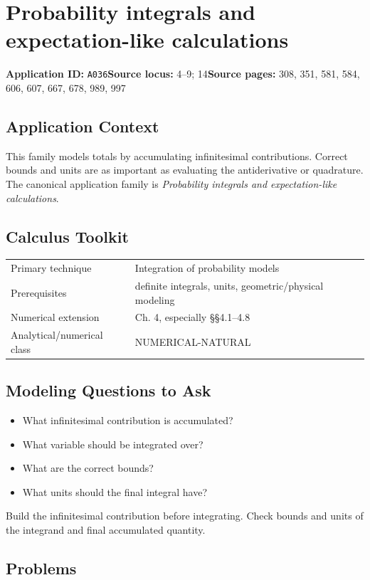 \documentclass[11pt]{book}
\newcommand{\pid}[1]{\texttt{#1}}
\begin{document}
\chapter{Probability integrals and expectation-like calculations}\label{app:A036}
\textbf{Application ID:} \pid{A036}\quad \textbf{Source locus:} 4–9; 14\quad \textbf{Source pages:} 308, 351, 581, 584, 606, 607, 667, 678, 989, 997
\section*{Application Context}
This family models totals by accumulating infinitesimal contributions. Correct bounds and units are as important as evaluating the antiderivative or quadrature. The canonical application family is \emph{Probability integrals and expectation-like calculations}.
\section*{Calculus Toolkit}
\begin{tabularx}{\textwidth}{@{}lX@{}}\toprule
Primary technique & Integration of probability models \\
Prerequisites & definite integrals, units, geometric/physical modeling \\
Numerical extension & Ch. 4, especially §§4.1–4.8 \\
Analytical/numerical class & NUMERICAL-NATURAL \\
\bottomrule\end{tabularx}
\section*{Modeling Questions to Ask}\begin{itemize}
\item What infinitesimal contribution is accumulated?
\item What variable should be integrated over?
\item What are the correct bounds?
\item What units should the final integral have?
\end{itemize}
\begin{errorbox}Build the infinitesimal contribution before integrating. Check bounds and units of the integrand and final accumulated quantity.\end{errorbox}
\section*{Problems}
\end{document}
